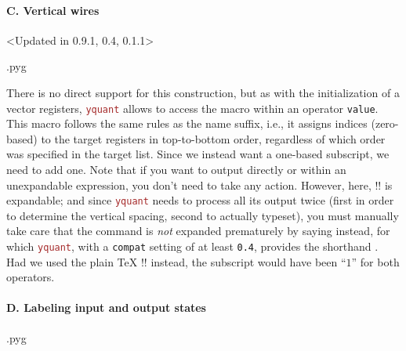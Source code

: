 \documentclass{scrartcl}
\makeatletter
\newenvironment{codeexample}{%
   \VerbatimEnvironment%
   \let\FVB@VerbatimOut\minted@FVB@VerbatimOut
   \let\FVE@VerbatimOut\minted@FVE@VerbatimOut
   \minted@configlang{tex}%
   \minted@fvset
   \begin{VerbatimOut}[codes={\catcode`\^^I=12},firstline,lastline]{\minted@jobname.pyg}%
}{
   \end{VerbatimOut}%
   \minted@langlinenoson%
   \savebox\codeexamplebox{ \minted@jobname.pyg}%
   \ifdim\wd\codeexamplebox>\dimexpr.5\linewidth-3mm\relax%
      \wd\codeexamplebox=.5\linewidth%
   \else%
      \wd\codeexamplebox=\dimexpr\wd\codeexamplebox+3mm\relax%
   \fi%
   \noindent\begin{minipage}{\wd\codeexamplebox}%
      \centering%
      \usebox\codeexamplebox%
   \end{minipage}%
   \begin{minipage}{\dimexpr\linewidth-\wd\codeexamplebox\relax}%
      \expandafter\minted@pygmentize\expandafter{\minted@lang}%
   \end{minipage}%
   \minted@langlinenosoff%
   \par%
}
\def\pkg#1{\textcolor{brown}{\texttt{#1}}}
\def\ttlink{\link\texttt}
\def\texlink{\link\tex}
\def\Yquant{\pkg{yquant}}
\makeatother
\begin{document}
            \paragraph{C. Vertical wires}\leavevmode
               \begin{example}<Updated in 0.9.1, 0.4, 0.1.1>
                  \begin{codeexample}
                  \end{codeexample}
                  There is no direct support for this construction, but as with the initialization of a vector registers, \Yquant{} allows to access the macro \texlink{\idx} within an operator \ttlink{value}.
                  This macro follows the same rules as the name suffix, i.e., it assigns indices (zero\hyp based) to the target registers in top\hyp to\hyp bottom order, regardless of which order was specified in the target list.
                  Since we instead want a one\hyp based subscript, we need to add one.
                  Note that if you want to output \texlink{\idx} directly or within an unexpandable expression, you don't need to take any action.
                  However, here, \tex!\the! is expandable; and since \Yquant{} needs to process all its output twice (first in order to determine the vertical spacing, second to actually typeset), you must manually take care that the command is \emph{not} expanded prematurely by saying \texlink[\protect]{\protect\the} instead, for which \Yquant{}, with a \ttlink{compat} setting of at least \texttt{0.4}, provides the shorthand \texlink\The.
                  Had we used the plain \TeX{} \tex!\the! instead, the subscript would have been ``$1$'' for both operators.
               \end{example}

            \paragraph{D. Labeling input and output states}\leavevmode
               \begin{example}
                  \begin{codeexample}
                  \end{codeexample}
               \end{example}
\end{document}
